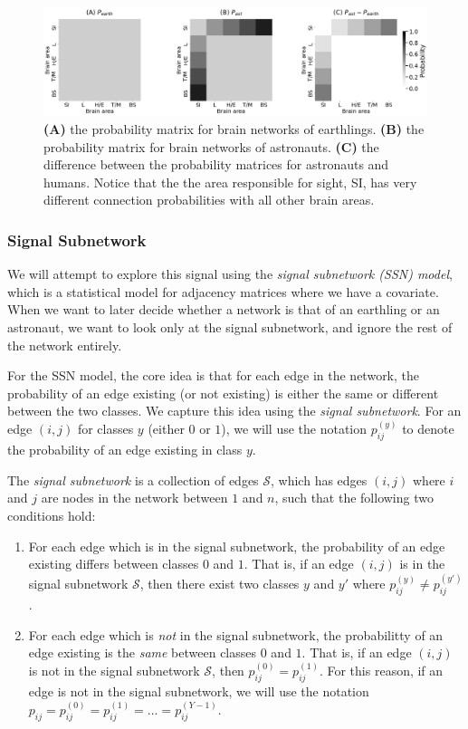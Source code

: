 \begin{figure}
    \centering
    \includegraphics[width=\linewidth]{representations/ch5/Images/ssg_pmtxs.png}
    \caption[Probability matrices from two different classes]{\textbf{(A)} the probability matrix for brain networks of earthlings. \textbf{(B)} the probability matrix for brain networks of astronauts. \textbf{(C)} the difference between the probability matrices for astronauts and humans. Notice that the the area responsible for sight, SI, has very different connection probabilities with all other brain areas.}
    \label{fig:ch5:ssg_pmtxs}
\end{figure}

\subsubsection*{Signal Subnetwork}

We will attempt to explore this signal using the \textit{signal subnetwork (SSN) model}, which is a statistical model for adjacency matrices where we have a covariate. When we want to later decide whether a network is that of an earthling or an astronaut, we want to look {only} at the signal subnetwork, and ignore the rest of the network entirely.

For the SSN model, the core idea is that for each edge in the network, the probability of an edge existing (or not existing) is either the same or different between the two classes. We capture this idea using the \textit{signal subnetwork}. For an edge $(i, j)$ for classes $y$ (either $0$ or $1$), we will use the notation $p_{ij}^{(y)}$ to denote the probability of an edge existing in class $y$. 

The \textit{signal subnetwork} \cite{Vogelstein2013Jul} is a collection of edges $\mathcal S$, which has edges $(i,j)$ where $i$ and $j$ are nodes in the network between $1$ and $n$, such that the following two conditions hold:

\begin{enumerate}
    \item For each edge which is in the signal subnetwork, the probability of an edge existing differs between classes $0$ and $1$. That is, if an edge $(i, j)$ is in the signal subnetwork $\mathcal S$, then there exist two classes $y$ and $y'$ where $p_{ij}^{(y)} \neq p_{ij}^{(y')}$.
    \item For each edge which is \textit{not} in the signal subnetwork, the probabilitty of an edge existing is the \textit{same} between classes $0$ and $1$. That is, if an edge $(i, j)$ is not in the signal subnetwork $\mathcal S$, then $p_{ij}^{(0)} = p_{ij}^{(1)}$. For this reason, if an edge is not in the signal subnetwork, we will use the notation $p_{ij} = p_{ij}^{(0)} = p_{ij}^{(1)} = ... = p_{ij}^{(Y-1)}$.
\end{enumerate}


